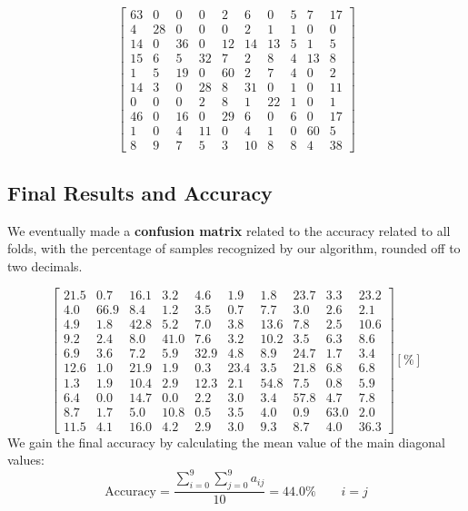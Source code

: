 \documentclass[11pt]{article}
\begin{document}
\begin{equation}
\begin{bmatrix}
63 & 0 & 0 & 0 & 2 & 6 & 0 & 5 & 7 & 17 \\
4 & 28 & 0 & 0 & 0 & 2 & 1 & 1 & 0 & 0 \\
14 & 0 & 36 & 0 & 12 & 14 & 13 & 5 & 1 & 5 \\
15 & 6 & 5 & 32 & 7 & 2 & 8 & 4 & 13 & 8 \\
1 & 5 & 19 & 0 & 60 & 2 & 7 & 4 & 0 & 2 \\
14 & 3 & 0 & 28 & 8 & 31 & 0 & 1 & 0 & 11 \\
0 & 0 & 0 & 2 & 8 & 1 & 22 & 1 & 0 & 1 \\
46 & 0 & 16 & 0 & 29 & 6 & 0 & 6 & 0 & 17 \\
1 & 0 & 4 & 11 & 0 & 4 & 1 & 0 & 60 & 5 \\
8 & 9 & 7 & 5 & 3 & 10 & 8 & 8 & 4 & 38
\end{bmatrix}
\end{equation}

\subsection{Final Results and Accuracy}
We eventually made a \textbf{confusion matrix} related to the accuracy related to all folds, with the percentage of samples recognized by our algorithm, rounded off to two decimals.

\begin{equation}
\begin{bmatrix}
21.5 & 0.7 & 16.1 & 3.2 & 4.6 & 1.9 & 1.8 & 23.7 & 3.3 & 23.2 \\
4.0 & 66.9 & 8.4 & 1.2 & 3.5 & 0.7 & 7.7 & 3.0 & 2.6 & 2.1 \\
4.9 & 1.8 & 42.8 & 5.2 & 7.0 & 3.8 & 13.6 & 7.8 & 2.5 & 10.6 \\
9.2 & 2.4 & 8.0 & 41.0 & 7.6 & 3.2 & 10.2 & 3.5 & 6.3 & 8.6 \\
6.9 & 3.6 & 7.2 & 5.9 & 32.9 & 4.8 & 8.9 & 24.7 & 1.7 & 3.4 \\
12.6 & 1.0 & 21.9 & 1.9 & 0.3 & 23.4 & 3.5 & 21.8 & 6.8 & 6.8 \\
1.3 & 1.9 & 10.4 & 2.9 & 12.3 & 2.1 & 54.8 & 7.5 & 0.8 & 5.9 \\
6.4 & 0.0 & 14.7 & 0.0 & 2.2 & 3.0 & 3.4 & 57.8 & 4.7 & 7.8 \\
8.7 & 1.7 & 5.0 & 10.8 & 0.5 & 3.5 & 4.0 & 0.9 & 63.0 & 2.0 \\
11.5 & 4.1 & 16.0 & 4.2 & 2.9 & 3.0 & 9.3 & 8.7 & 4.0 & 36.3
\end{bmatrix}
[\%]
\end{equation}
We gain the final accuracy by calculating the mean value of the main diagonal values:
\begin{equation}
\mathrm{Accuracy}=\frac{\displaystyle\sum_{i=0}^{9} \sum_{j=0}^{9} a_{ij}}{10}=44.0\% \qquad i=j
\end{equation}
\end{document}
